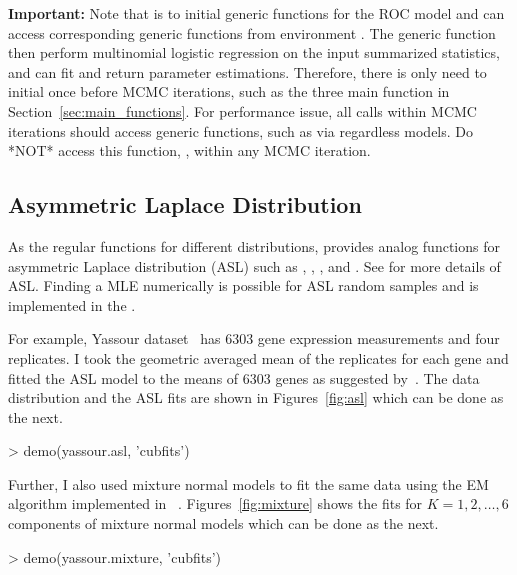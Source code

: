 {\color{red} \bf Important:}
Note that  is to initial generic functions
for the ROC model and  can access corresponding generic
functions from environment . The generic function then
perform multinomial logistic regression on the input summarized statistics,
and  can fit and return parameter estimations.
Therefore, there is only need to initial once before MCMC iterations, such as
the three main function in Section~\ref{sec:main_functions}. For performance
issue, all calls within MCMC iterations should access generic functions, such
as via  regardless models. Do *NOT*
access this function, , within any MCMC iteration.




\subsection[Asymmetric Laplace Distribution]{Asymmetric Laplace Distribution}
\label{sec:asl}

As the regular  functions for different distributions,
 provides analog functions for asymmetric Laplace distribution
(ASL) such as , , , and .
See \citep{KKP2001} for more details of ASL.
Finding a MLE numerically is possible for ASL random samples and
is implemented in the .

For example,
Yassour dataset~\citep{Yassour2009} has 6303 gene expression measurements and
four replicates.
I took the geometric averaged mean of the replicates for each gene and
fitted the ASL model to the means of 6303 genes as suggested
by~\cite{Wallace2013}.
The data distribution and the ASL fits are shown
in Figures~\ref{fig:asl} which can be done as the next.
\begin{Code}
> demo(yassour.asl, 'cubfits')
\end{Code}

Further, I also used mixture normal models to fit the same data using the EM
algorithm implemented in ~\citep{EMCluster}.
Figures~\ref{fig:mixture} shows the fits
for $K = 1, 2,\ldots, 6$ components of mixture normal models
which can be done as the next.
\begin{Code}
> demo(yassour.mixture, 'cubfits')
\end{Code}


